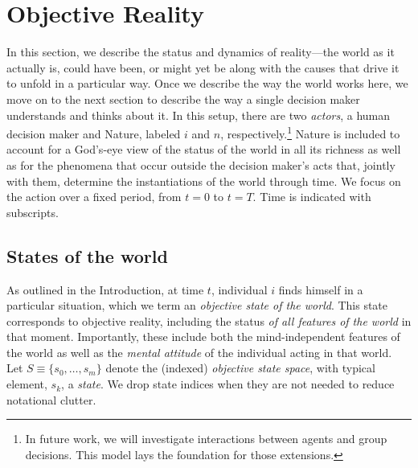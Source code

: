 \documentclass[
11pt,
titlepage,
reqno,
]{article}%
\theoremstyle{definition}
\begin{document}
	
\section{Objective Reality}\label{sec:world}
	
In this section, we describe the status and dynamics of reality---the world as it actually is, could have been, or might yet be along with the causes that drive it to unfold in a particular way. 
Once we describe the way the world works here, we move on to the next section to describe the way a single decision maker understands and thinks about it.
In this setup, there are two \textit{actors}, a human decision maker and Nature, labeled $i$ and $n$, respectively.\footnote
{
	In future work, we will investigate interactions between agents and group decisions.
		This model lays the foundation for those extensions.
} 
Nature is included to account for  a God's-eye view of the status of the world in all its richness as well as for the phenomena that occur outside the decision maker's acts that, jointly with them, determine the instantiations of the world through time.
We focus on the action over a fixed period, from $t=0$ to $t=T$. 
Time is indicated with subscripts.
	
	
	
	
	
\subsection{States of the world\label{sec:states}}
	
As outlined in the Introduction, at time $t$, individual $i$ finds himself in a particular situation, which we term an \textit{objective state of the world}.
This state corresponds to objective reality, including the status \textit{of all features of the world} in that moment. 
Importantly, these include both the  mind-independent features of the world as well as the \textit{mental attitude} of the individual acting in that world. 
Let $S\equiv\{s_0,\ldots,s_m\}$ denote the (indexed) \textit{objective state space}, with typical element, $s_k$, a \textit{state}.
We drop state indices when they are not needed to reduce notational clutter.
\end{document}

